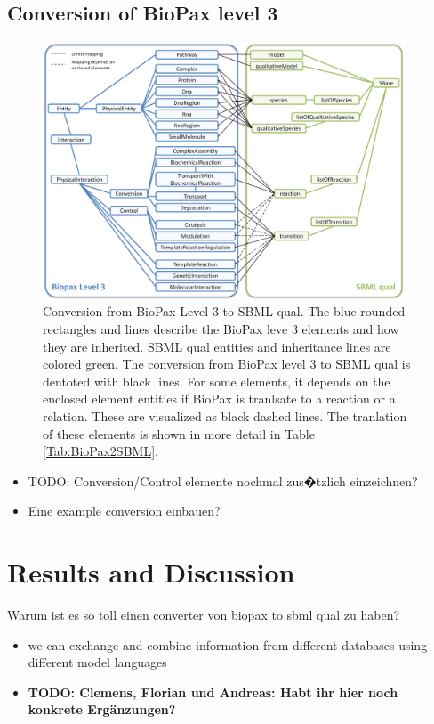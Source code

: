 \documentclass{bioinfo}
\begin{document}
\begin{methods}
\subsection{Conversion of BioPax level 3}
\begin{figure}[t!h]
\centering \includegraphics[width=0.96\textwidth]{BioPax3SBMLqual.png}
\caption{Conversion from BioPax Level 3 to SBML qual. The blue rounded rectangles and lines describe the BioPax leve 3 elements and how they are inherited. SBML qual entities and inheritance lines are colored green. The conversion from BioPax level 3 to SBML qual is dentoted with black lines. For some elements, it depends on the enclosed element entities if BioPax is tranlsate to a reaction or a relation. These are visualized as black dashed lines. The tranlation of these elements is shown in more detail in Table \ref{Tab:BioPax2SBML}.}\label{fig:BioPax3SBMLqual}
\end{figure}


\begin{itemize}
\item TODO: Conversion/Control elemente nochmal zus�tzlich einzeichnen?
\item Eine example conversion einbauen?
\end{itemize}
\end{methods}


\section{Results and Discussion}
Warum ist es so toll einen converter von biopax to sbml qual zu haben?
\begin{itemize}
\item we can exchange and combine information from different databases using different model languages
\item \textbf{TODO: Clemens, Florian und Andreas: Habt ihr hier noch konkrete Erg\"anzungen?}
\end{itemize}
\end{document}
